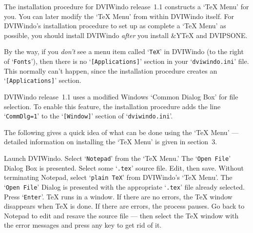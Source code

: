 The installation procedure for DVIWindo release~1.1 constructs a `TeX Menu'
for you. %
You can later modify the `TeX Menu' from within DVIWindo itself.
For DVIWindo's installation procedure to set up as complete
a `TeX Menu' as possible,
you should install DVIWindo {\it after\/} you install {\Y&Y}TeX and DVIPSONE.


By the way, if you {\it don't\/} see a menu item called `{\tt TeX}' in
DVIWindo (to the right of `{\tt Fonts}'), then there is no 
`{\tt [Applications]}' section in  your `{\tt dviwindo.ini}' file.
This normally can't happen, since the installation procedure creates an
`{\tt [Applications]}' section. 

DVIWindo release~1.1 uses a modified Windows `Common Dialog Box' 
for file selection.   
To enable this feature, the installation procedure adds the line
`{\tt CommDlg=1}' to the `{\tt [Window]}' section of `{\tt dviwindo.ini}'.


The following gives a quick idea of what can be done using the `TeX Menu'
--- detailed information on installing the `TeX Menu' is given in section~3.

Launch DVIWindo.  Select `{\tt Notepad}' from the `TeX Menu.'  The `{\tt Open
File}' Dialog Box is presented.  Select some %
`{\tt .tex}' source file.
Edit, then save.  Without terminating Notepad, select `{\tt plain TeX}' from
DVIWindo's  `TeX Menu'.  The `{\tt Open File}' Dialog is presented with the
appropriate `{\tt .tex}' file already selected.  Press `{\tt Enter}'.  {\TeX}
runs in a window.  If there are no errors, the {\TeX} window disappears 
when {\TeX} is done. %
If there are errors, the process pauses.  Go back to Notepad to edit 
and resave the source file --- then select the {\TeX} window with the error
messages and press any key to get rid of it.  

